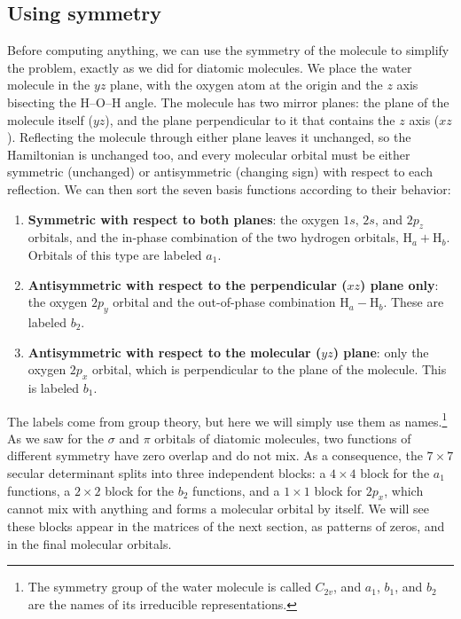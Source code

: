 \documentclass[
  english,
  9pt,
]{extbook}
\providecommand{\tightlist}{%
  \setlength{\itemsep}{0pt}\setlength{\parskip}{0pt}}
\theoremstyle{definition}
\theoremstyle{definition}
\theoremstyle{definition}
\theoremstyle{definition}
\theoremstyle{remark}
\begin{document}
\subsection{Using symmetry}\label{using-symmetry}

Before computing anything, we can use the symmetry of the molecule to simplify the problem, exactly as we did for diatomic molecules. We place the water molecule in the \(yz\) plane, with the oxygen atom at the origin and the \(z\) axis bisecting the H--O--H angle. The molecule has two mirror planes: the plane of the molecule itself (\(yz\)), and the plane perpendicular to it that contains the \(z\) axis (\(xz\)). Reflecting the molecule through either plane leaves it unchanged, so the Hamiltonian is unchanged too, and every molecular orbital must be either symmetric (unchanged) or antisymmetric (changing sign) with respect to each reflection. We can then sort the seven basis functions according to their behavior:

\begin{enumerate}
\def\labelenumi{\arabic{enumi}.}
\tightlist
\item
  \textbf{Symmetric with respect to both planes}: the oxygen \(1s\), \(2s\), and \(2p_z\) orbitals, and the in-phase combination of the two hydrogen orbitals, \(\mathrm{H}_a + \mathrm{H}_b\). Orbitals of this type are labeled \(a_1\).
\item
  \textbf{Antisymmetric with respect to the perpendicular (\(xz\)) plane only}: the oxygen \(2p_y\) orbital and the out-of-phase combination \(\mathrm{H}_a - \mathrm{H}_b\). These are labeled \(b_2\).
\item
  \textbf{Antisymmetric with respect to the molecular (\(yz\)) plane}: only the oxygen \(2p_x\) orbital, which is perpendicular to the plane of the molecule. This is labeled \(b_1\).
\end{enumerate}

The labels come from group theory, but here we will simply use them as names.\footnote{The symmetry group of the water molecule is called \(C_{2v}\), and \(a_1\), \(b_1\), and \(b_2\) are the names of its irreducible representations.} As we saw for the \(\sigma\) and \(\pi\) orbitals of diatomic molecules, two functions of different symmetry have zero overlap and do not mix. As a consequence, the \(7\times7\) secular determinant splits into three independent blocks: a \(4\times4\) block for the \(a_1\) functions, a \(2\times2\) block for the \(b_2\) functions, and a \(1\times1\) block for \(2p_x\), which cannot mix with anything and forms a molecular orbital by itself. We will see these blocks appear in the matrices of the next section, as patterns of zeros, and in the final molecular orbitals.
\end{document}
